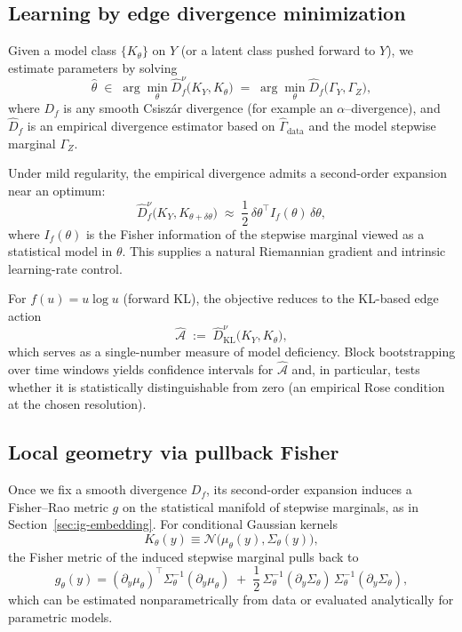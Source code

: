 \documentclass[11pt]{article}
\newcommand{\1}{\mathbf{1}}
\begin{document}
\subsection{Learning by edge divergence minimization}

Given a model class \(\{K_\theta\}\) on \(Y\) (or a latent class pushed forward to \(Y\)), we estimate parameters by solving
\[
  \widehat{\theta}
  \;\in\;
  \arg\min_{\theta}
  \widehat{D}_f^\nu\bigl(K_Y,K_\theta\bigr)
  \;=\;
  \arg\min_{\theta}
  \widehat{D}_f\bigl(\Gamma_Y,\Gamma_Z\bigr),
\]
where \(D_f\) is any smooth Csiszár divergence (for example an \(\alpha\)–divergence), and \(\widehat{D}_f\) is an empirical divergence estimator based on \(\widehat{\Gamma}_{\text{data}}\) and the model stepwise marginal \(\Gamma_Z\).

Under mild regularity, the empirical divergence admits a second-order expansion near an optimum:
\[
  \widehat{D}_f^\nu\bigl(K_Y,K_{\theta+\delta\theta}\bigr)
  \;\approx\;
  \frac{1}{2}\,\delta\theta^\top I_f(\theta)\,\delta\theta,
\]
where \(I_f(\theta)\) is the Fisher information of the stepwise marginal viewed as a statistical model in \(\theta\). This supplies a natural Riemannian gradient and intrinsic learning-rate control.

For \(f(u)=u\log u\) (forward KL), the objective reduces to the KL-based edge action
\[
  \widehat{\mathcal{A}}
  \;:=\;
  \widehat{D}_{\mathrm{KL}}^\nu\bigl(K_Y,K_\theta\bigr),
\]
which serves as a single-number measure of model deficiency. Block bootstrapping over time windows yields confidence intervals for \(\widehat{\mathcal{A}}\) and, in particular, tests whether it is statistically distinguishable from zero (an empirical Rose condition at the chosen resolution).


\subsection{Local geometry via pullback Fisher}

Once we fix a smooth divergence \(D_f\), its second-order expansion induces a Fisher--Rao metric \(g\) on the statistical manifold of stepwise marginals, as in Section~\ref{sec:ig-embedding}. For conditional Gaussian kernels
\[
  K_\theta(y) \equiv \mathcal{N}\!\bigl(\mu_\theta(y),\Sigma_\theta(y)\bigr),
\]
the Fisher metric of the induced stepwise marginal pulls back to
\[
  g_\theta(y) 
  =
  (\partial_y\mu_\theta)^\top\Sigma_\theta^{-1}(\partial_y\mu_\theta)
  \;+\;
  \frac{1}{2}\,
  \Sigma_\theta^{-1}(\partial_y\Sigma_\theta)\,\Sigma_\theta^{-1}(\partial_y\Sigma_\theta),
\]
which can be estimated nonparametrically from data or evaluated analytically for parametric models.
\end{document}
